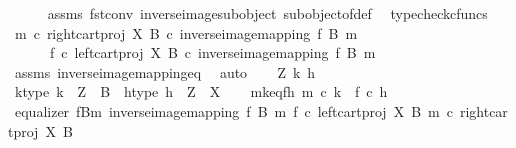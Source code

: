\begin{isabellebody}
\ \ \ \ \isamarkupfalse%
\ assms\ fst{\isacharunderscore}{\kern0pt}conv\ inverse{\isacharunderscore}{\kern0pt}image{\isacharunderscore}{\kern0pt}subobject\ subobject{\isacharunderscore}{\kern0pt}of{\isacharunderscore}{\kern0pt}def\ \isamarkupfalse%
\ {\isacharparenleft}{\kern0pt}typecheck{\isacharunderscore}{\kern0pt}cfuncs{\isacharparenright}{\kern0pt}\isanewline
\isanewline
\ \ \isamarkupfalse%
\ {\isachardoublequoteopen}m\ {\isasymcirc}\isactrlsub c\ right{\isacharunderscore}{\kern0pt}cart{\isacharunderscore}{\kern0pt}proj\ X\ B\ {\isasymcirc}\isactrlsub c\ inverse{\isacharunderscore}{\kern0pt}image{\isacharunderscore}{\kern0pt}mapping\ f\ B\ m\ {\isacharequal}{\kern0pt}\isanewline
\ \ \ \ \ \ f\ {\isasymcirc}\isactrlsub c\ left{\isacharunderscore}{\kern0pt}cart{\isacharunderscore}{\kern0pt}proj\ X\ B\ {\isasymcirc}\isactrlsub c\ inverse{\isacharunderscore}{\kern0pt}image{\isacharunderscore}{\kern0pt}mapping\ f\ B\ m{\isachardoublequoteclose}\isanewline
\ \ \ \ \isamarkupfalse%
\ assms\ inverse{\isacharunderscore}{\kern0pt}image{\isacharunderscore}{\kern0pt}mapping{\isacharunderscore}{\kern0pt}eq\ \isamarkupfalse%
\ auto\isanewline
{}\isamarkupfalse%
\isanewline
\ \ \isamarkupfalse%
\ Z\ k\ h\isanewline
\ \ \isamarkupfalse%
\ k{\isacharunderscore}{\kern0pt}type{\isacharcolon}{\kern0pt}\ {\isachardoublequoteopen}k\ {\isacharcolon}{\kern0pt}\ Z\ {\isasymrightarrow}\ B{\isachardoublequoteclose}\ \ h{\isacharunderscore}{\kern0pt}type{\isacharcolon}{\kern0pt}\ {\isachardoublequoteopen}h\ {\isacharcolon}{\kern0pt}\ Z\ {\isasymrightarrow}\ X{\isachardoublequoteclose}\isanewline
\ \ \isamarkupfalse%
\ mk{\isacharunderscore}{\kern0pt}eq{\isacharunderscore}{\kern0pt}fh{\isacharcolon}{\kern0pt}\ {\isachardoublequoteopen}m\ {\isasymcirc}\isactrlsub c\ k\ {\isacharequal}{\kern0pt}\ f\ {\isasymcirc}\isactrlsub c\ h{\isachardoublequoteclose}\isanewline
\isanewline
\ \ \isamarkupfalse%
\ {\isachardoublequoteopen}equalizer\ {\isacharparenleft}{\kern0pt}f\isactrlsup {\isacharminus}{\kern0pt}B{\isasymrparr}\isactrlbsub m\isactrlesub {\isacharparenright}{\kern0pt}\ {\isacharparenleft}{\kern0pt}inverse{\isacharunderscore}{\kern0pt}image{\isacharunderscore}{\kern0pt}mapping\ f\ B\ m{\isacharparenright}{\kern0pt}\ {\isacharparenleft}{\kern0pt}f\ {\isasymcirc}\isactrlsub c\ left{\isacharunderscore}{\kern0pt}cart{\isacharunderscore}{\kern0pt}proj\ X\ B{\isacharparenright}{\kern0pt}\ {\isacharparenleft}{\kern0pt}m\ {\isasymcirc}\isactrlsub c\ right{\isacharunderscore}{\kern0pt}cart{\isacharunderscore}{\kern0pt}proj\ X\ B\ {\isacharparenright}{\kern0pt}{\isachardoublequoteclose}\isanewline

\end{isabellebody}

